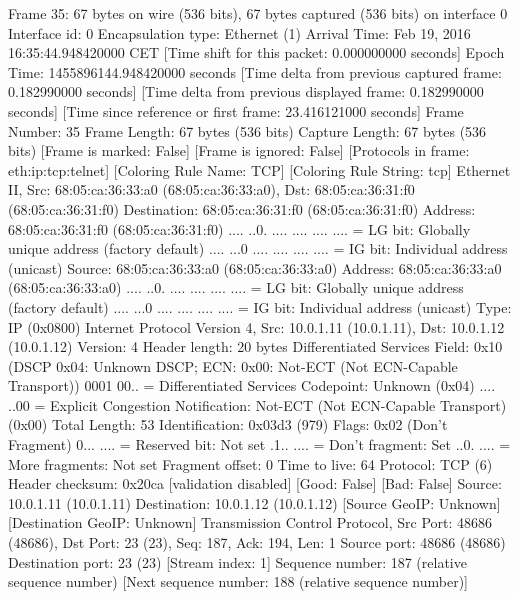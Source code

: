 Frame 35: 67 bytes on wire (536 bits), 67 bytes captured (536 bits) on interface 0
    Interface id: 0
    Encapsulation type: Ethernet (1)
    Arrival Time: Feb 19, 2016 16:35:44.948420000 CET
    [Time shift for this packet: 0.000000000 seconds]
    Epoch Time: 1455896144.948420000 seconds
    [Time delta from previous captured frame: 0.182990000 seconds]
    [Time delta from previous displayed frame: 0.182990000 seconds]
    [Time since reference or first frame: 23.416121000 seconds]
    Frame Number: 35
    Frame Length: 67 bytes (536 bits)
    Capture Length: 67 bytes (536 bits)
    [Frame is marked: False]
    [Frame is ignored: False]
    [Protocols in frame: eth:ip:tcp:telnet]
    [Coloring Rule Name: TCP]
    [Coloring Rule String: tcp]
Ethernet II, Src: 68:05:ca:36:33:a0 (68:05:ca:36:33:a0), Dst: 68:05:ca:36:31:f0 (68:05:ca:36:31:f0)
    Destination: 68:05:ca:36:31:f0 (68:05:ca:36:31:f0)
        Address: 68:05:ca:36:31:f0 (68:05:ca:36:31:f0)
        .... ..0. .... .... .... .... = LG bit: Globally unique address (factory default)
        .... ...0 .... .... .... .... = IG bit: Individual address (unicast)
    Source: 68:05:ca:36:33:a0 (68:05:ca:36:33:a0)
        Address: 68:05:ca:36:33:a0 (68:05:ca:36:33:a0)
        .... ..0. .... .... .... .... = LG bit: Globally unique address (factory default)
        .... ...0 .... .... .... .... = IG bit: Individual address (unicast)
    Type: IP (0x0800)
Internet Protocol Version 4, Src: 10.0.1.11 (10.0.1.11), Dst: 10.0.1.12 (10.0.1.12)
    Version: 4
    Header length: 20 bytes
    Differentiated Services Field: 0x10 (DSCP 0x04: Unknown DSCP; ECN: 0x00: Not-ECT (Not ECN-Capable Transport))
        0001 00.. = Differentiated Services Codepoint: Unknown (0x04)
        .... ..00 = Explicit Congestion Notification: Not-ECT (Not ECN-Capable Transport) (0x00)
    Total Length: 53
    Identification: 0x03d3 (979)
    Flags: 0x02 (Don't Fragment)
        0... .... = Reserved bit: Not set
        .1.. .... = Don't fragment: Set
        ..0. .... = More fragments: Not set
    Fragment offset: 0
    Time to live: 64
    Protocol: TCP (6)
    Header checksum: 0x20ca [validation disabled]
        [Good: False]
        [Bad: False]
    Source: 10.0.1.11 (10.0.1.11)
    Destination: 10.0.1.12 (10.0.1.12)
    [Source GeoIP: Unknown]
    [Destination GeoIP: Unknown]
Transmission Control Protocol, Src Port: 48686 (48686), Dst Port: 23 (23), Seq: 187, Ack: 194, Len: 1
    Source port: 48686 (48686)
    Destination port: 23 (23)
    [Stream index: 1]
    Sequence number: 187    (relative sequence number)
    [Next sequence number: 188    (relative sequence number)]
